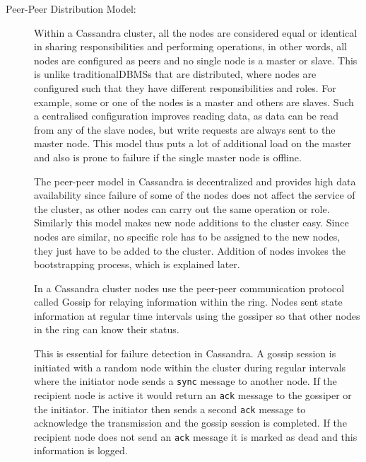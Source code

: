 \begin{description}
\item[Peer-Peer Distribution Model:] Within a Cassandra cluster, all the nodes
are considered equal or identical in sharing responsibilities and
performing operations, in other words, all nodes are configured as peers and no
single node is a master or slave.  This is unlike traditional\acp{DBMS} that
are distributed, where nodes are configured such that they have different
responsibilities and roles. For example, some or one of the nodes is a master
and others are slaves.
Such a centralised configuration improves reading data, as data can be read from
any of the slave nodes, but write requests are always sent to the master node. This model
thus puts a lot of additional load on the master and also is prone to failure if
the single master node is offline. 

The peer-peer model in Cassandra is decentralized and  provides high data
availability since failure of some of the nodes does not affect the service of
the cluster, as other nodes can carry out the same operation or role. Similarly
this model makes new node additions to the cluster easy. Since nodes are
similar, no specific role has to be assigned to the new nodes, they just have to
be added to the cluster. Addition of nodes invokes the bootstrapping process,
which is explained later.

In a Cassandra cluster nodes use the peer-peer communication protocol called
Gossip for relaying information within the ring. Nodes sent state information at
regular time intervals using the gossiper so that other nodes in the ring can
know their status.

This is essential for failure detection in Cassandra. A gossip session is
initiated with a random node within the cluster during regular intervals where the initiator node  sends a
\texttt{sync} message to another node. If  the recipient node is active it would
return an \texttt{ack} message to the gossiper or the initiator. The initiator
then sends a second \texttt{ack} message to acknowledge the transmission and the
gossip session is completed. If the recipient node does not send an \texttt{ack}
message it is marked as dead and this information is logged.


\end{description}
